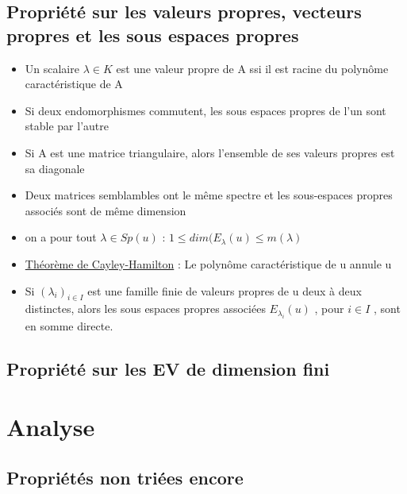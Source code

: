 \documentclass{article}
\begin{document}
\subsection{Propriété sur les valeurs propres, vecteurs propres et les sous espaces propres}
\begin{itemize}[label=$\ast$]
	\item Un scalaire \( \lambda \in K \) est une valeur propre de A ssi il est racine du polynôme caractéristique de A
	\item Si deux endomorphismes commutent, les sous espaces propres de l'un sont stable par l'autre
	\item Si A est une matrice triangulaire, alors l'ensemble de ses valeurs propres est sa diagonale
	\item Deux matrices semblambles ont le même spectre et les sous-espaces propres associés sont de même dimension
	\item on a pour tout \( \lambda \in Sp(u) \) : \( 1 \leq dim(E_{\lambda}(u) \leq m(\lambda) \)
	\item \underline{Théorème de Cayley-Hamilton} : Le polynôme caractéristique de u annule u
	\item Si \( (\lambda_i)_{i \in I} \) est une famille finie de valeurs propres de u deux à deux distinctes, alors les sous espaces propres associées \(E_{\lambda_{i}}(u)\) , pour \(i \in I \) , sont en somme directe.
\end{itemize}

\subsection{Propriété sur les EV de dimension fini}

\section{Analyse}

\subsection{Propriétés non triées encore}
\end{document}
